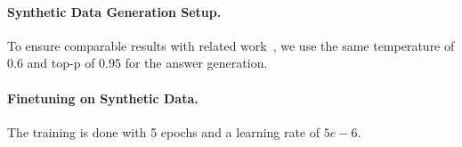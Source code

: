 \paragraph{Synthetic Data Generation Setup.} To ensure comparable results with related work~\citep{liu2025understandingr1zeroliketrainingcritical}, we use the same temperature of $0.6$ and top-p of $0.95$ for the answer generation.

\paragraph{Finetuning on Synthetic Data.} The training is done with 5 epochs and a learning rate of $5e-6$. 




